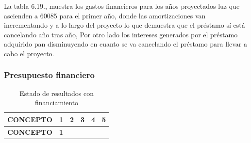 \documentclass[
  stu,
  floatsintext,
  longtable,
  a4paper,
  nolmodern,
  notxfonts,
  notimes,
  12pt,
  colorlinks=true,linkcolor=blue,citecolor=blue,urlcolor=blue]{apa7}
\begin{document}
La tabla 6.19., muestra los gastos financieros para los años proyectados
luz que ascienden a 60085 para el primer año, donde las amortizaciones
van incrementando y a lo largo del proyecto lo que demuestra que el
préstamo sí está cancelando año tras año, Por otro lado los intereses
generados por el préstamo adquirido pan disminuyendo en cuanto se va
cancelando el préstamo para llevar a cabo el proyecto.

\subsubsection{Presupuesto financiero}\label{presupuesto-financiero}

\begin{longtable}[]{@{}
  >{\raggedright\arraybackslash}p{}
  >{\centering\arraybackslash}p{}
  >{\centering\arraybackslash}p{}
  >{\centering\arraybackslash}p{}
  >{\centering\arraybackslash}p{}
  >{\centering\arraybackslash}p{}@{}}
\caption{Estado de resultados con financiamiento}\tabularnewline
\toprule\noalign{}
\begin{minipage}[b]{\linewidth}\raggedright
\textbf{CONCEPTO}
\end{minipage} & \begin{minipage}[b]{\linewidth}\centering
\textbf{1}
\end{minipage} & \begin{minipage}[b]{\linewidth}\centering
\textbf{2}
\end{minipage} & \begin{minipage}[b]{\linewidth}\centering
\textbf{3}
\end{minipage} & \begin{minipage}[b]{\linewidth}\centering
\textbf{4}
\end{minipage} & \begin{minipage}[b]{\linewidth}\centering
\textbf{5}
\end{minipage} \\
\midrule\noalign{}
\endfirsthead
\toprule\noalign{}
\begin{minipage}[b]{\linewidth}\raggedright
\textbf{CONCEPTO}
\end{minipage} & \begin{minipage}[b]{\linewidth}\centering
\textbf{1}
\end{minipage} & \begin{minipage}[b]{\linewidth}\centering

\end{minipage}
\end{longtable}
\end{document}
